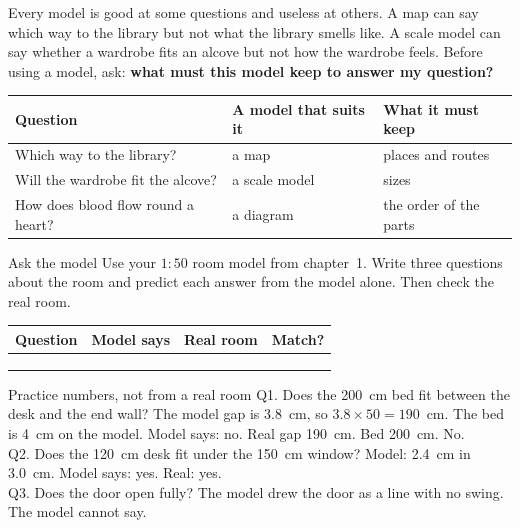 \label{ch3}

Every model is good at some questions and useless at others. A map can say which way to the library but not what the library smells like. A scale model can say whether a wardrobe fits an alcove but not how the wardrobe feels. Before using a model, ask: \textbf{what must this model keep to answer my question?}

\begin{center}
\sffamily\small\renewcommand{\arraystretch}{1.5}
\begin{tabular}{@{}p{3.4cm}p{3.7cm}p{3.7cm}@{}}
\toprule
\textbf{Question} & \textbf{A model that suits it} & \textbf{What it must keep}\\
\midrule
Which way to the library? & a map & places and routes\\
Will the wardrobe fit the alcove? & a scale model & sizes\\
How does blood flow round a heart? & a diagram & the order of the parts\\
\bottomrule
\end{tabular}
\end{center}

\begin{tryit}{Ask the model}
Use your $1:50$ room model from chapter~1. Write three questions about the room and predict each answer from the model alone. Then check the real room.\par\medskip
\renewcommand{\arraystretch}{1.8}
\begin{tabular}{|p{4.2cm}|p{2.8cm}|p{2.2cm}|c|}
\hline
\textbf{Question} & \textbf{Model says} & \textbf{Real room} & \textbf{Match?}\\ \hline
 & & & \\ \hline
 & & & \\ \hline
 & & & \\ \hline
\end{tabular}
\end{tryit}

\begin{worked}{Practice numbers, not from a real room}
Q1. Does the 200~cm bed fit between the desk and the end wall? The model gap is 3.8~cm, so $3.8\times50=190$~cm. The bed is 4~cm on the model. Model says: no. Real gap 190~cm. Bed 200~cm. No.\\
Q2. Does the 120~cm desk fit under the 150~cm window? Model: 2.4~cm in 3.0~cm. Model says: yes. Real: yes.\\
Q3. Does the door open fully? The model drew the door as a line with no swing. The model cannot say.
\end{worked}

